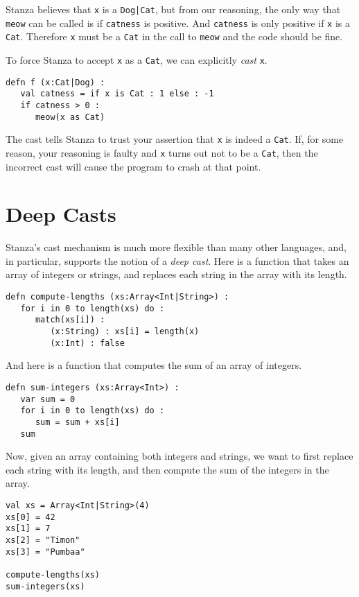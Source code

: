 \documentclass[10pt,oneside]{book}
\begin{document}
Stanza believes that \texttt{\frenchspacing x} is a \texttt{\frenchspacing Dog|Cat}, but from our reasoning, the only way that \texttt{\frenchspacing meow} can be called is if \texttt{\frenchspacing catness} is positive. And \texttt{\frenchspacing catness} is only positive if \texttt{\frenchspacing x} is a \texttt{\frenchspacing Cat}. Therefore \texttt{\frenchspacing x} must be a \texttt{\frenchspacing Cat} in the call to \texttt{\frenchspacing meow} and the code should be fine.

To force Stanza to accept \texttt{\frenchspacing x} as a \texttt{\frenchspacing Cat}, we can explicitly {\em cast} \texttt{\frenchspacing x}.
\begin{lstlisting}
defn f (x:Cat|Dog) :
   val catness = if x is Cat : 1 else : -1
   if catness > 0 :
      meow(x as Cat)
\end{lstlisting}
The cast tells Stanza to trust your assertion that \texttt{\frenchspacing x} is indeed a \texttt{\frenchspacing Cat}. If, for some reason, your reasoning is faulty and \texttt{\frenchspacing x} turns out not to be a \texttt{\frenchspacing Cat}, then the incorrect cast will cause the program to crash at that point.

\section{Deep Casts}
Stanza's cast mechanism is much more flexible than many other languages, and, in particular, supports the notion of a {\em deep cast}. 
Here is a function that takes an array of integers or strings, and replaces each string in the array with its length.
\begin{lstlisting}
defn compute-lengths (xs:Array<Int|String>) :
   for i in 0 to length(xs) do :
      match(xs[i]) :
         (x:String) : xs[i] = length(x)
         (x:Int) : false
\end{lstlisting}

And here is a function that computes the sum of an array of integers.
\begin{lstlisting}
defn sum-integers (xs:Array<Int>) :
   var sum = 0
   for i in 0 to length(xs) do :
      sum = sum + xs[i]
   sum   
\end{lstlisting}

Now, given an array containing both integers and strings, we want to first replace each string with its length, and then compute the sum of the integers in the array.
\begin{lstlisting}
val xs = Array<Int|String>(4)
xs[0] = 42
xs[1] = 7
xs[2] = "Timon"
xs[3] = "Pumbaa"

compute-lengths(xs)
sum-integers(xs)
\end{lstlisting}
\end{document}
